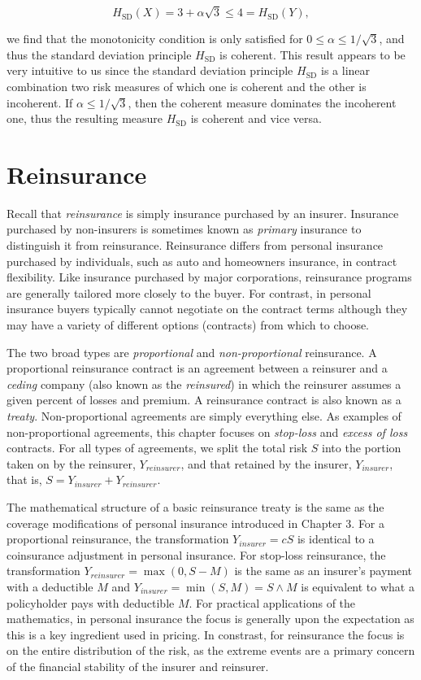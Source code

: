 \documentclass[]{book}
\theoremstyle{definition}
\theoremstyle{definition}
\theoremstyle{definition}
\theoremstyle{remark}
\begin{document}
\[
  H_{\mathrm{SD}}(X) = 3+\alpha\sqrt{3} \leq4= H_{\mathrm{SD}}(Y),
\]

we find that the monotonicity condition is only satisfied for
\(0\leq\alpha\leq 1/\sqrt{3}\), and thus the standard deviation
principle \(H_{\mathrm{SD}}\) is coherent. This result appears to be
very intuitive to us since the standard deviation principle
\(H_{\mathrm{SD}}\) is a linear combination two risk measures of which
one is coherent and the other is incoherent. If
\(\alpha\leq 1/\sqrt{3}\), then the coherent measure dominates the
incoherent one, thus the resulting measure \(H_{\mathrm{SD}}\) is
coherent and vice versa.

\section{Reinsurance}\label{S:Reinsurance}

Recall that \emph{reinsurance} is simply insurance purchased by an
insurer. Insurance purchased by non-insurers is sometimes known as
\emph{primary} insurance to distinguish it from reinsurance. Reinsurance
differs from personal insurance purchased by individuals, such as auto
and homeowners insurance, in contract flexibility. Like insurance
purchased by major corporations, reinsurance programs are generally
tailored more closely to the buyer. For contrast, in personal insurance
buyers typically cannot negotiate on the contract terms although they
may have a variety of different options (contracts) from which to
choose.

The two broad types are \emph{proportional} and \emph{non-proportional}
reinsurance. A proportional reinsurance contract is an agreement between
a reinsurer and a \emph{ceding} company (also known as the
\emph{reinsured}) in which the reinsurer assumes a given percent of
losses and premium. A reinsurance contract is also known as a
\emph{treaty}. Non-proportional agreements are simply everything else.
As examples of non-proportional agreements, this chapter focuses on
\emph{stop-loss} and \emph{excess of loss} contracts. For all types of
agreements, we split the total risk \(S\) into the portion taken on by
the reinsurer, \(Y_{reinsurer}\), and that retained by the insurer,
\(Y_{insurer}\), that is, \(S= Y_{insurer}+Y_{reinsurer}\).

The mathematical structure of a basic reinsurance treaty is the same as
the coverage modifications of personal insurance introduced in Chapter
3. For a proportional reinsurance, the transformation
\(Y_{insurer} = c S\) is identical to a coinsurance adjustment in
personal insurance. For stop-loss reinsurance, the transformation
\(Y_{reinsurer} = \max(0,S-M)\) is the same as an insurer's payment with
a deductible \(M\) and \(Y_{insurer} = \min(S,M) = S \wedge M\) is
equivalent to what a policyholder pays with deductible \(M\). For
practical applications of the mathematics, in personal insurance the
focus is generally upon the expectation as this is a key ingredient used
in pricing. In constrast, for reinsurance the focus is on the entire
distribution of the risk, as the extreme events are a primary concern of
the financial stability of the insurer and reinsurer.
\end{document}
